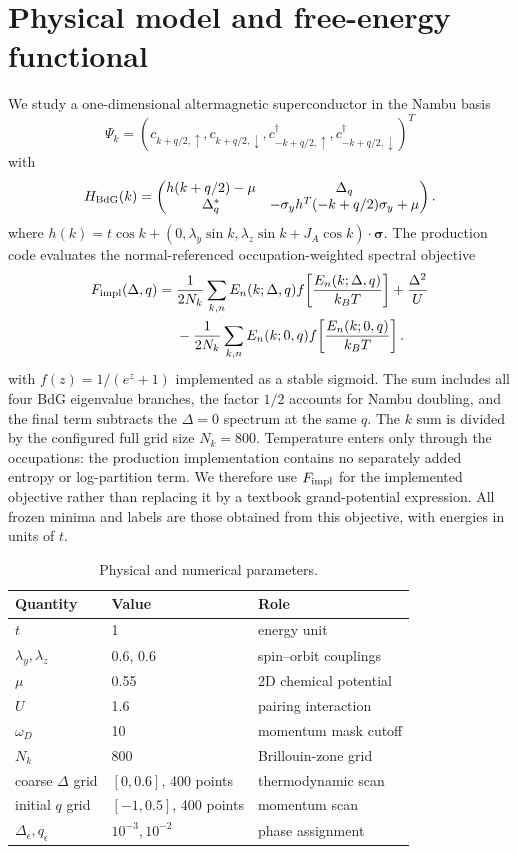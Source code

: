 \section{Physical model and free-energy functional}\label{sec:model}
We study a one-dimensional altermagnetic superconductor in the Nambu basis
\[\Psi_k=(c_{k+q/2,\uparrow},c_{k+q/2,\downarrow},c^\dagger_{-k+q/2,\uparrow},c^\dagger_{-k+q/2,\downarrow})^T\] with
\begin{equation}
H_{\rm BdG}(k)=\begin{pmatrix}h(k+q/2)-\mu&\Delta_q\\ \Delta_q^*&-\sigma_y h^T(-k+q/2)\sigma_y+\mu\end{pmatrix}.
\end{equation}
where $h(k)=t\cos k+(0,\lambda_y\sin k,\lambda_z\sin k+J_A\cos k)\cdot\boldsymbol\sigma$.
The production code evaluates the normal-referenced occupation-weighted spectral objective
\begin{align}
F_{\rm impl}(\Delta,q)={}&\frac{1}{2N_k}\sum_{k,n}E_n(k;\Delta,q)
f\!\left[\frac{E_n(k;\Delta,q)}{k_BT}\right]+\frac{\Delta^2}{U}\notag\\
&-\frac{1}{2N_k}\sum_{k,n}E_n(k;0,q)
f\!\left[\frac{E_n(k;0,q)}{k_BT}\right].
\end{align}
with $f(z)=1/(e^z+1)$ implemented as a stable sigmoid.  The sum includes all four BdG eigenvalue branches, the factor $1/2$ accounts for Nambu doubling, and the final term subtracts the $\Delta=0$ spectrum at the same $q$.  The $k$ sum is divided by the configured full grid size $N_k=800$.  Temperature enters only through the occupations: the production implementation contains no separately added entropy or log-partition term.  We therefore use $F_{\rm impl}$ for the implemented objective rather than replacing it by a textbook grand-potential expression.  All frozen minima and labels are those obtained from this objective, with energies in units of $t$.

\begin{table}[tb]\caption{Physical and numerical parameters.}\label{tab:s1}\centering
\begin{tabular}{lll}\toprule Quantity & Value & Role\\\midrule
$t$ & 1 & energy unit\\ $\lambda_y,\lambda_z$ & 0.6, 0.6 & spin--orbit couplings\\ $\mu$ & 0.55 & 2D chemical potential\\ $U$ & 1.6 & pairing interaction\\ $\omega_D$ & 10 & momentum mask cutoff\\ $N_k$ & 800 & Brillouin-zone grid\\ coarse $\Delta$ grid & $[0,0.6]$, 400 points & thermodynamic scan\\ initial $q$ grid & $[-1,0.5]$, 400 points & momentum scan\\ $\Delta_\epsilon,q_\epsilon$ & $10^{-3},10^{-2}$ & phase assignment\\\bottomrule\end{tabular}\end{table}


